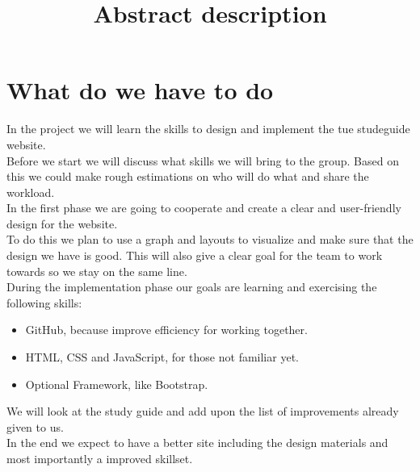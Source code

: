 \documentclass[a4paper,10pt]{article}
\title{Abstract description}
\begin{document}
\maketitle
\section*{What do we have to do}
In the project we will learn the skills to design and implement the tue studeguide website.\\
Before we start we will discuss what skills we will bring to the group. Based on this we could make rough estimations on who will do what and share the workload.\\
In the first phase we are going to cooperate and create a clear and user-friendly design for the website.\\
To do this we plan to use a graph and layouts to visualize and make sure that the design we have is good. This will also give a clear goal for the team to work towards so we stay on the same line.\\
During the implementation phase our goals are learning and exercising the following skills:\\
\begin{itemize}
  \item GitHub, because improve efficiency for working together.
  \item HTML, CSS and JavaScript, for those not familiar yet.
  \item Optional Framework, like Bootstrap.
\end{itemize}
We will look at the study guide and add upon the list of improvements already given to us.\\
In the end we expect to have a better site including the design materials and most importantly a improved skillset.\\
\end{document}
